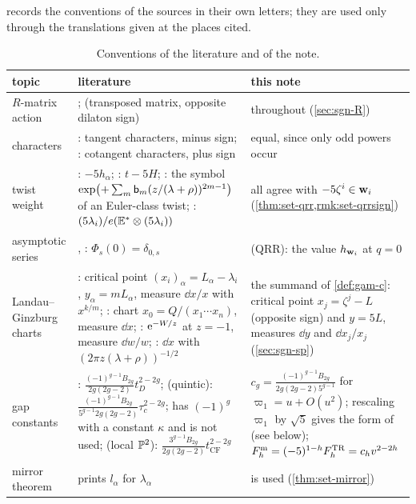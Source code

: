  records the conventions of the sources in their own letters; they are used only through the translations given at the places cited.

\begin{table}[ht]
\caption{Conventions of the literature and of the note.}
\label{tab:sgn-lit}
\centering
\footnotesize
\renewcommand{\arraystretch}{1.2}
\begin{tabular}{@{}>{\raggedright\arraybackslash}p{}>{\raggedright\arraybackslash}p{}>{\raggedright\arraybackslash}p{}@{}}
\hline
topic & literature & this note \\
\hline
$R$-matrix action & \cite[Def.~2.2]{PPZ15}; \cite[\S2.3]{Dunin-Barkowski:2015caa} (transposed matrix, opposite dilaton sign) & \cite{PPZ15} throughout (\cref{sec:sgn-R}) \\
characters & \cite[\S2.2, Theorem~1]{Giv01}: tangent characters, minus sign; \cite[9.1~Theorem]{MR1901075}: cotangent characters, plus sign & equal, since only odd powers occur \\
twist weight & \cite[(17)]{GJR18}: $-5h_\alpha$; \cite[(20)]{GJR17}: $t-5H$; \cite[Corollary~1]{MR2276766}: the symbol $\exp\bigl(+\sum_m\mathsf{b}_m(z/(\lambda+\rho))^{2m-1}\bigr)$ of an Euler-class twist; \cite[(26)]{LP20}: $(5\lambda_i)/e(\mathbb E^*\otimes(5\lambda_i))$ & all agree with $-5\zeta^i\in\mathbf{w}_i$ (\cref{thm:set-qrr,rmk:set-qrrsign}) \\
asymptotic series & \cite[Theorem~4 (i)]{ZZ08}, \cite[\S2.4.4, (18)]{LP20}: $\Phi_s(0)=\delta_{0,s}$ & (QRR): the value $h_{\mathbf{w}_i}$ at $q=0$ \\
Landau--Ginzburg charts & \cite[\S7, Remark~7.2]{GJR18}: critical point $(x_i)_\alpha=L_\alpha-\lambda_i$, $y_\alpha=mL_\alpha$, measure $\dd x/x$ with $x^{k/m}$; \cite[\S10]{MR1901075}: chart $x_0=Q/(x_1\cdots x_n)$, measure $\dd x$; \cite[Lemma~4.20]{MR2553377}: $\mathrm{e}^{-W/z}$ at $z=-1$, measure $\dd w/w$; \cite[\S7, (11)]{MR2276766}: $\dd x$ with $(2\pi z(\lambda+\rho))^{-1/2}$ & the summand of \cref{def:gam-c}: critical point $x_j=\zeta^j-L$ (opposite sign) and $y=5L$, measures $\dd y$ and $\dd x_j/x_j$ (\cref{sec:sgn-sp}) \\
gap constants & \cite[(1.2)]{HKQ09}: $\frac{(-1)^{g-1}B_{2g}}{2g(2g-2)}t_D^{2-2g}$; \cite[Conjecture~1.5]{CGYZ26} (quintic): $\frac{(-1)^{g-1}B_{2g}}{5^{g-1}2g(2g-2)}\tau_c^{2-2g}$; \cite[Definition~1.8]{CGYZ26} has $(-1)^g$ with a constant $\kappa$ and is not used; \cite[(1.5)]{Br25} (local $\mathbb{P}^2$): $\frac{3^{g-1}B_{2g}}{2g(2g-2)}t_{\mathrm{CF}}^{2-2g}$ & $c_g=\frac{(-1)^{g-1}B_{2g}}{2g(2g-2)5^{g-1}}$ for $\varpi_1=u+O(u^2)$; rescaling $\varpi_1$ by $\sqrt5$ gives the form of \cite[(1.2)]{HKQ09} (see below); $F^{\mathrm{m}}_h=(-5)^{1-h}F^{\mathrm{TR}}_h=c_hv^{2-2h}$ \\
mirror theorem & \cite[Corollary~11.7]{MR1408320} prints $l_\alpha$ for $\lambda_\alpha$ & \cite[Theorem~11.6]{MR1408320} is used (\cref{thm:set-mirror}) \\
\hline
\end{tabular}
\end{table}

